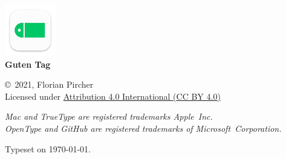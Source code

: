 \begin{center}
  \vfill
  
  \includegraphics[width=6em]{Images/Icon.pdf} \\
  \textbf{Guten Tag} \\
  
  \vfill
  
  ©~2021,  Florian Pircher \\
  {Licensed under \href{https://creativecommons.org/licenses/by/4.0/}{Attribution 4.0 International ({\lsstyle{}CC BY 4.0})}}
  
  \bigskip
  
  \bgroup
  \fontsize{8.5pt}{12pt}\selectfont
  
  \textit{\emph{Mac} and \emph{TrueType} are registered trademarks Apple~Inc.} \\
  \textit{\emph{OpenType} and \emph{GitHub} are registered trademarks of Microsoft~Corporation.} \\
  \egroup
  
  \bigskip
  
  Typeset on \today.
\end{center}
